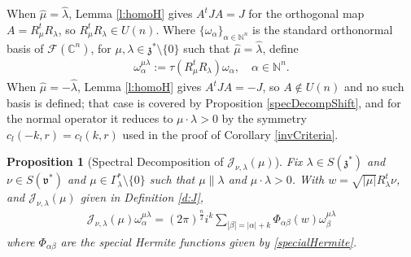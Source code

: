 \documentclass[11pt]{amsart}
\theoremstyle{plain}
\newtheorem{proposition}[theorem]{Proposition}
\theoremstyle{definition}
\theoremstyle{remark}
\numberwithin{equation}{section}
\def\fz{\mathfrak{z}}
\def\fv{\mathfrak{v}}
\def\cJ{\mathcal{J}}
\def\cF{\mathcal{F}}
\def\mz{\setminus\{0\}}
\def\C{{\mathbb C}}%
\def\N{{\mathbb N}}%
\numberwithin{equation}{section}
\begin{document}
When $\hat{\mu}=\hat{\lambda}$, Lemma \ref{l:homoH} gives $A^tJA=J$ for the orthogonal map $A=R_\mu^tR_\lambda$, so $R_\mu^tR_\lambda\in U(n)$. Where $\{\omega_\alpha\}_{\alpha\in \N^n}$ is the standard orthonormal basis of $\cF(\C^n)$, for $\mu, \lambda\in \fz^*\mz$ such that $\hat{\mu}=\hat{\lambda}$, define
\begin{align*}
    \omega^{\mu\lambda}_\alpha:=\tau(R_\mu^tR_\lambda)\omega_\alpha, \quad \alpha\in \N^n.
\end{align*}
When $\hat{\mu}=-\hat{\lambda}$, Lemma \ref{l:homoH} gives $A^tJA=-J$, so $A\notin U(n)$ and no such basis is defined; that case is covered by Proposition \ref{specDecompShift}, and for the normal operator it reduces to $\mu\cdot\lambda>0$ by the symmetry $c_l(-k, r)=c_l(k, r)$ used in the proof of Corollary \ref{invCriteria}.
\begin{proposition}[Spectral Decomposition of $\mathcal{J}_{\nu, \lambda}(\mu)$]\label{specDecomp}
Fix $\lambda\in S(\fz^*)$ and $\nu\in S(\fv^*)$ and $\mu\in \Gamma_\lambda^*\mz$ such that $\mu\parallel\lambda$ and $\mu\cdot\lambda>0$. With $w=\sqrt{|\mu|}R_\lambda^t\nu$, and $\cJ_{\nu, \lambda}(\mu)$ given in Definition \ref{d:J},
\begin{align*}
\cJ_{\nu, \lambda}(\mu)\omega_\alpha^{\mu\lambda}=(2\pi)^{\frac{n}{2}}i^k\sum_{|\beta|=|\alpha|+k}\Phi_{\alpha\beta}(w)\omega_\beta^{\mu\lambda}
\end{align*}
where $\Phi_{\alpha\beta}$ are the special Hermite functions given by \eqref{specialHermite}.
\end{proposition}
\end{document}

